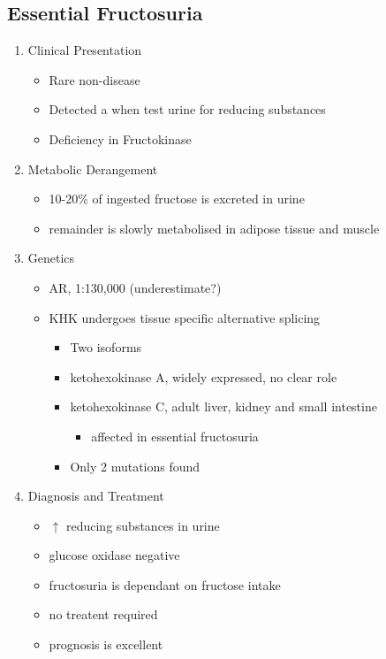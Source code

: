 \documentclass{scrartcl}
\begin{document}
\subsection{Essential Fructosuria}
\label{sec:orgae7d7bd}
\begin{enumerate}
\item Clinical Presentation
\label{sec:org8312321}
\begin{itemize}
\item Rare non-disease
\item Detected a when test urine for reducing substances
\item Deficiency in Fructokinase
\end{itemize}
\item Metabolic Derangement
\label{sec:org5bf028e}
\begin{itemize}
\item 10-20\% of ingested fructose is excreted in urine
\item remainder is slowly metabolised in adipose tissue and muscle
\end{itemize}
\item Genetics
\label{sec:org61c0b4f}
\begin{itemize}
\item AR, 1:130,000 (underestimate?)
\item KHK undergoes tissue specific alternative splicing
\begin{itemize}
\item Two isoforms
\item ketohexokinase A, widely expressed, no clear role
\item ketohexokinase C, adult liver, kidney and small intestine
\begin{itemize}
\item affected in essential fructosuria
\end{itemize}
\item Only 2 mutations found
\end{itemize}
\end{itemize}
\item Diagnosis and Treatment
\label{sec:org3fd4c4f}
\begin{itemize}
\item \(\uparrow\) reducing substances in urine
\item glucose oxidase negative
\item fructosuria is dependant on fructose intake
\item no treatent required
\item prognosis is excellent
\end{itemize}
\end{enumerate}
\end{document}
